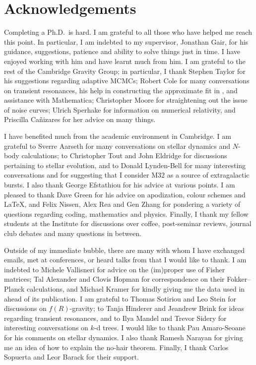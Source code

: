 \chapter*{Acknowledgements}
\label{acknowledgements}

Completing a Ph.D.\ is hard. I am grateful to all those who have helped me reach this point. In particular, I am indebted to my supervisor, Jonathan Gair, for his guidance, suggestions, patience and ability to solve things just in time. I have enjoyed working with him and have learnt much from him. I am grateful to the rest of the Cambridge Gravity Group; in particular, I thank Stephen Taylor for his suggestions regarding adaptive MCMCs; Robert Cole for many conversations on transient resonances, his help in constructing the approximate fit in , and assistance with Mathematica; Christopher Moore for straightening out the issue of noise curves; Ulrich Sperhake for information on numerical relativity, and Priscilla Ca\~{n}izares for her advice on many things.

I have benefited much from the academic environment in Cambridge. I am grateful to Sverre Aarseth for many conversations on stellar dynamics and $N$-body calculations; to Christopher Tout and John Eldridge for discussions pertaining to stellar evolution, and to Donald Lynden-Bell for many interesting conversations and for suggesting that I consider M32 as a source of extragalactic bursts. I also thank George Efstathiou for his advice at various points. I am pleased to thank Dave Green for his advice on apodization, colour schemes and \LaTeX, and Felix Nissen, Alex Rea and Gen Zhang for pondering a variety of questions regarding coding, mathematics and physics. Finally, I thank my fellow students at the Institute for discussions over coffee, post-seminar reviews, journal club debates and many questions in between.

Outside of my immediate bubble, there are many with whom I have exchanged emails, met at conferences, or heard talks from that I would like to thank. I am indebted to Michele Vallisneri for advice on the (im)proper use of Fisher matrices; Tal Alexander and Clovis Hopman for correspondence on their Fokker--Planck calculations, and Michael Kramer for kindly giving me the data used in  ahead of its publication. I am grateful to Thomas Sotiriou and Leo Stein for discussions on $f(R)$-gravity; to Tanja Hinderer and Jeandrew Brink for ideas regarding transient resonances, and to Ilya Mandel and Trevor Sidery for interesting conversations on $k$-d trees. I would like to thank Pau Amaro-Seoane for his comments on stellar dynamics. I also thank Ramesh Narayan for giving me an idea of how to explain the no-hair theorem. Finally, I thank Carlos Sopuerta and Leor Barack for their support.

